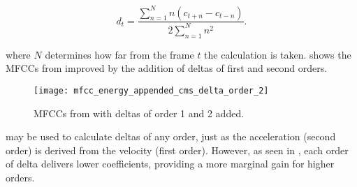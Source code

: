 \begin{equation}
    d_t = \frac{\sum_{n=1}^N n(c_{t+n} - c_{t-n})}{2\sum_{n=1}^N n^2}.
    \label{eq:deltas}
\end{equation}

\noindent where $N$ determines how far from the frame $t$ the calculation is taken.  shows the MFCCs from  improved by the addition of deltas of first and second orders.

\begin{figure}[ht]
    \centering
    \texttt{[image: mfcc\_energy\_appended\_cms\_delta\_order\_2]}
    \caption{MFCCs from  with deltas of order 1 and 2 added.}
    \label{fig:mfcc_energy_appended_cms_delta_order_2}
\end{figure}

 may be used to calculate deltas of any order, just as the acceleration (second order) is derived from the velocity (first order). However, as seen in , each order of delta delivers lower coefficients, providing a more marginal gain for higher orders.